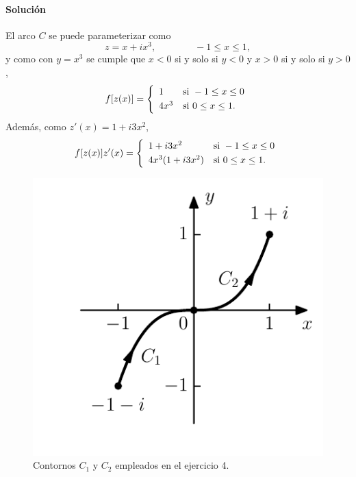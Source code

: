 \documentclass[a4paper]{report}
\begin{document}
\paragraph{Solución} El arco \(C\) se puede parameterizar como 
\[
 z=x+ix^3,
 \qquad\qquad
 -1\leq x\leq1,
\]
y como con \(y=x^3\) se cumple que \(x<0\) si y solo si \(y<0\) y \(x>0\) si y solo si \(y>0\),
\[
 f[z(x)]=\left\{ 
 \begin{array}{ll}
  1 & \textrm{si }-1\leq x\leq 0\\[\smallskipamount]
  4x^3 & \textrm{si }0\leq x\leq 1.
 \end{array}
 \right.
\]
Además, como \(z'(x)=1+i3x^2\),
\[
 f[z(x)]z'(x)=\left\{ 
 \begin{array}{ll}
  1+i3x^2 & \textrm{si }-1\leq x\leq0\\[\smallskipamount]
  4x^3(1+i3x^2) & \textrm{si }0\leq x\leq 1.
 \end{array}
 \right.
\]
\begin{figure}[!htb]
  \begin{minipage}[c]{0.35\textwidth}
    \includegraphics[width=\textwidth]{figuras/exercise_46_04.pdf}
  \end{minipage}\hfill
  \begin{minipage}[c]{0.55\textwidth}
    \caption{
        Contornos \(C_1\) y \(C_2\) empleados en el ejercicio 4.
    }\label{fig:exercise_46_04}
  \end{minipage}
\end{figure}
\end{document}
